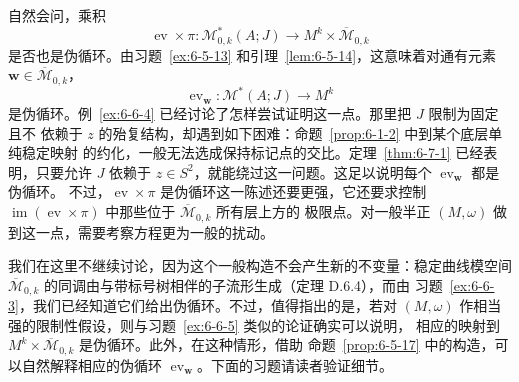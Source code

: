 自然会问，乘积
\[
  \operatorname{ev}\times\pi:\mathcal M^*_{0,k}(A;J)
  \longrightarrow M^k\times\overline{\mathcal M}_{0,k}
\]
是否也是伪循环。由习题~\ref{ex:6-5-13} 和引理~\ref{lem:6-5-14}，这意味着对通有元素
$\mathbf w\in\overline{\mathcal M}_{0,k}$，
\[
  \operatorname{ev}_{\mathbf w}:\mathcal M^*(A;J)\longrightarrow M^k
\]
是伪循环。例~\ref{ex:6-6-4} 已经讨论了怎样尝试证明这一点。那里把 $J$ 限制为固定且不
依赖于 $z$ 的殆复结构，却遇到如下困难：命题~\ref{prop:6-1-2} 中到某个底层单纯稳定映射
的约化，一般无法选成保持标记点的交比。定理~\ref{thm:6-7-1} 已经表明，只要允许 $J$
依赖于 $z\in S^2$，就能绕过这一问题。这足以说明每个 $\operatorname{ev}_{\mathbf w}$ 都是伪循环。
不过，$\operatorname{ev}\times\pi$ 是伪循环这一陈述还要更强，它还要求控制
$\operatorname{im}(\operatorname{ev}\times\pi)$ 中那些位于 $\overline{\mathcal M}_{0,k}$ 所有层上方的
极限点。对一般半正 $(M,\omega)$ 做到这一点，需要考察方程更为一般的扰动。

我们在这里不继续讨论，因为这个一般构造不会产生新的不变量：稳定曲线模空间
$\overline{\mathcal M}_{0,k}$ 的同调由与带标号树相伴的子流形生成（定理 D.6.4），而由
习题~\ref{ex:6-6-3}，我们已经知道它们给出伪循环。不过，值得指出的是，若对
$(M,\omega)$ 作相当强的限制性假设，则与习题~\ref{ex:6-6-5} 类似的论证确实可以说明，
相应的映射到 $M^k\times\overline{\mathcal M}_{0,k}$ 是伪循环。此外，在这种情形，借助
命题~\ref{prop:6-5-17} 中的构造，可以自然解释相应的伪循环
$\operatorname{ev}_{\mathbf w}$。下面的习题请读者验证细节。

